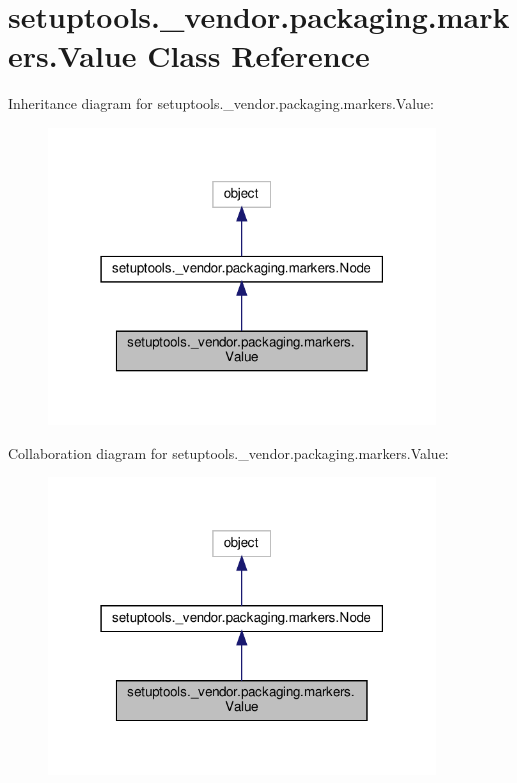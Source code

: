 \hypertarget{classsetuptools_1_1__vendor_1_1packaging_1_1markers_1_1Value}{}\section{setuptools.\+\_\+vendor.\+packaging.\+markers.\+Value Class Reference}
\label{classsetuptools_1_1__vendor_1_1packaging_1_1markers_1_1Value}


Inheritance diagram for setuptools.\+\_\+vendor.\+packaging.\+markers.\+Value\+:
\nopagebreak
\begin{figure}[H]
\begin{center}
\leavevmode
\includegraphics[width=291pt]{classsetuptools_1_1__vendor_1_1packaging_1_1markers_1_1Value__inherit__graph}
\end{center}
\end{figure}


Collaboration diagram for setuptools.\+\_\+vendor.\+packaging.\+markers.\+Value\+:
\nopagebreak
\begin{figure}[H]
\begin{center}
\leavevmode
\includegraphics[width=291pt]{classsetuptools_1_1__vendor_1_1packaging_1_1markers_1_1Value__coll__graph}
\end{center}
\end{figure}
